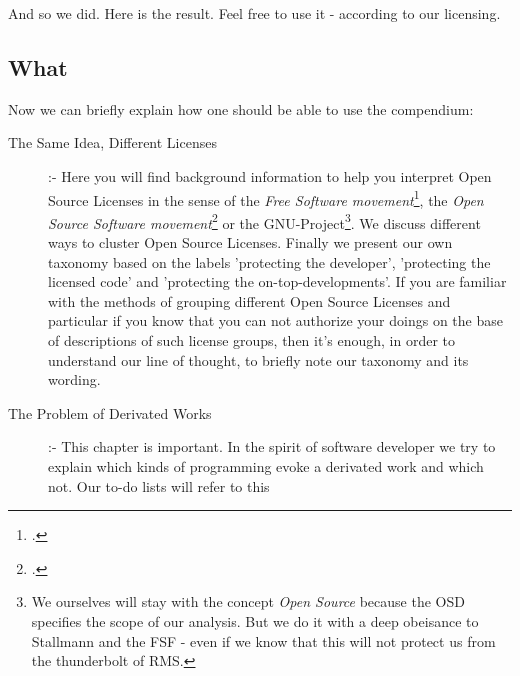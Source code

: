 And so we did. Here is the result. Feel free to use it - according to our
licensing.

\subsection{What}

Now we can briefly explain how one should be able to use the compendium:

\begin{description}
  \item[The Same Idea, Different Licenses] :- Here you will find background
  information to help you interpret Open Source Licenses in the sense of the
  \emph{Free Software movement}\footcite[At least at this place you are perhaps
  expecting that we use the logograms FLOSS, F/OSS, F/LOSS, or whatever. As you
  will read later on the word \textit{Free} is ambiguous and has strained the
  use of the concept \textit{Free Software}. Later on we will also talk about
  the invention of the concept \textit{Open Source} designed as a 'replacement'
  and acting as a 'splitter'. The mentioned logograms are introduced to
  re-establish or - at least - to underline the common history and the common
  center of 'both' movements, whereby the word \textit{Libre} shall resolve the
  ambiguity of the word \textit{Free}. For a first survey cf.] [\nopage
  wp.]{wpFloss2011a}, the \emph{Open Source Software movement}\footcite[For
  another brief and informative introduction cf.][231ff esp. p.
  232f.]{Fogel2006a} or the GNU-Project\footnote{ We ourselves will stay with the
  concept \textit{Open Source} because the OSD specifies the scope of our
  analysis. But we do it with a deep obeisance to Stallmann and the FSF - even
  if we know that this will not protect us from the thunderbolt of RMS.}. We discuss
  different ways to cluster Open Source Licenses. Finally we present our own
  taxonomy based on the labels 'protecting the developer', 'protecting the
  licensed code' and 'protecting the on-top-developments'. If you are familiar
  with the methods of grouping different Open Source Licenses and particular
  if you know that you can not authorize your doings on the base of descriptions
  of such license groups, then it's enough, in order to understand our line of
  thought, to briefly note our taxonomy and its wording.
  \item[The Problem of Derivated Works] :- This chapter is important. In the
  spirit of software developer we try to explain which kinds of programming
  evoke a derivated work and which not. Our to-do lists will refer to this

\end{description}
